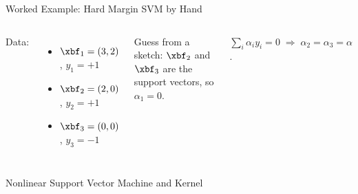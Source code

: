\documentclass[aspectratio=169,xcolor=dvipsnames,svgnames,x11names,fleqn]{beamer}
\begin{document}
\begin{frame}{Worked Example: Hard Margin SVM by Hand}
    \begin{columns}
    Data:
    \begin{itemize}
        \item $\xbf_1 = (3, 2)$, \; $y_1 = +1$
        \item $\xbf_2 = (2, 0)$, \; $y_2 = +1$
        \item $\xbf_3 = (0, 0)$, \; $y_3 = -1$
    \end{itemize}

    \vspace{6pt}

    Guess from a sketch: $\xbf_2$ and $\xbf_3$ are the support vectors, so $\alpha_1 = 0$.

    \vspace{6pt}

    $\sum_i \alpha_i y_i = 0 \;\Rightarrow\; \alpha_2 = \alpha_3 = \alpha$.

    \end{columns}
\end{frame}


\begin{sectionframe}{\faDeviantart}{Nonlinear Support Vector Machine and Kernel}
\end{sectionframe}
\end{document}
